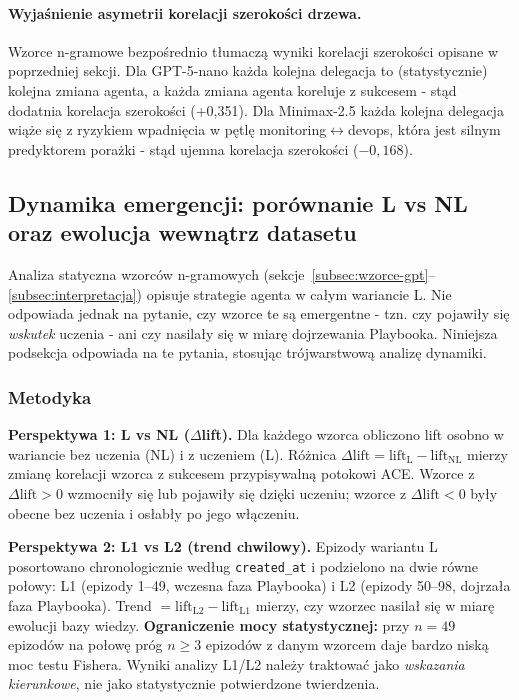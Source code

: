 \paragraph{Wyjaśnienie asymetrii korelacji szerokości drzewa.}
Wzorce n-gramowe bezpośrednio tłumaczą wyniki korelacji szerokości opisane w poprzedniej sekcji. Dla GPT-5-nano każda kolejna delegacja to (statystycznie) kolejna zmiana agenta, a każda zmiana agenta koreluje z sukcesem - stąd dodatnia korelacja szerokości (+0,351). Dla Minimax-2.5 każda kolejna delegacja wiąże się z ryzykiem wpadnięcia w pętlę monitoring$\leftrightarrow$devops, która jest silnym predyktorem porażki - stąd ujemna korelacja szerokości ($-0{,}168$).

\subsection{Dynamika emergencji: porównanie L vs NL oraz ewolucja wewnątrz datasetu}
\label{subsec:emergencja-dynamika}

Analiza statyczna wzorców n-gramowych (sekcje~\ref{subsec:wzorce-gpt}--\ref{subsec:interpretacja}) opisuje strategie agenta w całym wariancie L. Nie odpowiada jednak na pytanie, czy wzorce te są emergentne - tzn. czy pojawiły się \emph{wskutek} uczenia - ani czy nasilały się w miarę dojrzewania Playbooka. Niniejsza podsekcja odpowiada na te pytania, stosując trójwarstwową analizę dynamiki.

\subsubsection{Metodyka}

\textbf{Perspektywa 1: L vs NL ($\Delta$lift).} Dla każdego wzorca obliczono lift osobno w wariancie bez uczenia (NL) i z uczeniem (L). Różnica $\Delta\mathrm{lift} = \mathrm{lift}_\mathrm{L} - \mathrm{lift}_\mathrm{NL}$ mierzy zmianę korelacji wzorca z sukcesem przypisywalną potokowi ACE. Wzorce z $\Delta\mathrm{lift} > 0$ wzmocniły się lub pojawiły się dzięki uczeniu; wzorce z $\Delta\mathrm{lift} < 0$ były obecne bez uczenia i osłabły po jego włączeniu.

\textbf{Perspektywa 2: L1 vs L2 (trend chwilowy).} Epizody wariantu L posortowano chronologicznie według \texttt{created\_at} i podzielono na dwie równe połowy: L1 (epizody 1--49, wczesna faza Playbooka) i L2 (epizody 50--98, dojrzała faza Playbooka). Trend $= \mathrm{lift}_\mathrm{L2} - \mathrm{lift}_\mathrm{L1}$ mierzy, czy wzorzec nasilał się w miarę ewolucji bazy wiedzy. \textbf{Ograniczenie mocy statystycznej:} przy $n = 49$ epizodów na połowę próg $n \geq 3$ epizodów z danym wzorcem daje bardzo niską moc testu Fishera. Wyniki analizy L1/L2 należy traktować jako \emph{wskazania kierunkowe}, nie jako statystycznie potwierdzone twierdzenia.

